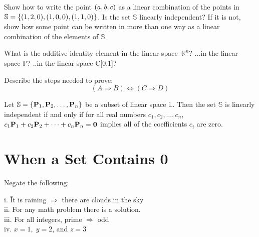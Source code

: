 \begin{myexa}[\bd{a}]
	Show how to write the point $({a},{b},{c})$ as a linear combination of the points in $\mathbb{S} = \{ ({1},{2},{0}),({1},{0},{0}),({1},{1},{0}) \}$. Is the set $\mathbb{S}$ linearly independent? If it is not, show how some point can be written in more than one way as a linear combination of the elements of $\mathbb{S}$.
\end{myexa}

\begin{myexb}[\bd{b}]
	What is the additive identity element in the linear space~$\mathbb{R}^n$? \quad ...in the linear space $\mathbb{P}$? \quad ..in the linear space C[0,1]?
\end{myexb}

\begin{myexc}[\bd{c}]
	Describe the steps needed to prove:\[ (A \Longrightarrow B) \Longleftrightarrow (C \Longrightarrow D)\]
\end{myexc}

\begin{theorem}
	Let $\mathbb{S} = \{ \textbf{P}_1 , \textbf{P}_2 ,\ldots, \textbf{P}_n \}$ be a subset of  linear space $\mathbb{L}$. Then the set  $\mathbb{S}$ is linearly independent if and only if for all real numbers $c_1,c_2,\ldots,c_n$, $c_1\textbf{P}_1 + c_2\textbf{P}_2 +\cdots+c_n\textbf{P}_n = \textbf{0}$  implies all of the coefficients $c_i$ are zero.
\end{theorem}
\vspace{-.3in}\hspace{5in}\begin{annotation}
\end{annotation}

\section{When a Set Contains 0}    \label{When a Set Contains 0}

\begin{myexa}[\bd{a}]
	Negate the following:
		\begin{tabbing}
			\indent i. \quad  \= It is raining $\Longrightarrow$ there are clouds in the sky\\
			\indent ii.\> For any math problem there is a solution. \\
			\indent iii. \> For all integers, prime $\Longrightarrow$ odd\\
			\indent iv. \> $x=1, \; y=2$, and $z=3$\\
		\end{tabbing}
\end{myexa}

